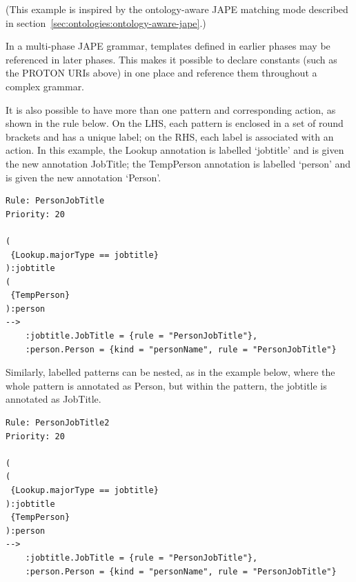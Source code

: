 (This example is inspired by the ontology-aware JAPE matching mode described in
section~\ref{sec:ontologies:ontology-aware-jape}.)

In a multi-phase JAPE grammar, templates defined in earlier phases may be
referenced in later phases.  This makes it possible to declare constants (such
as the PROTON URIs above) in one place and reference them throughout a complex
grammar.


It is also possible to have more than one pattern and corresponding
action, as shown in the rule below. On the LHS, each pattern is enclosed in a set
of round brackets and has a unique label; on the RHS, each label is
associated with an action. In this example, the Lookup annotation is
labelled `jobtitle' and is given the new annotation JobTitle; the
TempPerson annotation is labelled `person' and is given the new
annotation `Person'.

\begin{small}
\begin{verbatim}
Rule: PersonJobTitle
Priority: 20

(
 {Lookup.majorType == jobtitle}
):jobtitle
(
 {TempPerson}
):person
-->
    :jobtitle.JobTitle = {rule = "PersonJobTitle"},
    :person.Person = {kind = "personName", rule = "PersonJobTitle"}
\end{verbatim}
\end{small}

Similarly, labelled patterns can be nested, as in the example below,
where the whole pattern is annotated as Person, but within the
pattern, the jobtitle is annotated as JobTitle.

\begin{small}
\begin{verbatim}
Rule: PersonJobTitle2
Priority: 20

(
(
 {Lookup.majorType == jobtitle}
):jobtitle
 {TempPerson}
):person
-->
    :jobtitle.JobTitle = {rule = "PersonJobTitle"},
    :person.Person = {kind = "personName", rule = "PersonJobTitle"}
\end{verbatim}
\end{small}


